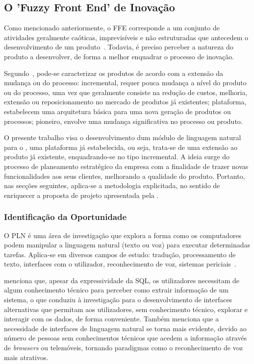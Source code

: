 \subsection{O 'Fuzzy Front End' de Inovação}

Como mencionado anteriormente, o \gls{FFE} corresponde a um conjunto de atividades geralmente caóticas, imprevisíveis e não estruturadas que antecedem o desenvolvimento de um produto~\parencite{ffe_incremental_platform_breakthrough_products}. Todavia, é preciso perceber a natureza do produto a desenvolver, de forma a melhor enquadrar o processo de inovação.

Segundo~\textcite{ffe_incremental_platform_breakthrough_products}, pode-se caracterizar os produtos de acordo com a extensão da mudança ou do processo: incremental, requer pouca mudança a nível do produto ou do processo, uma vez que geralmente consiste na redução de custos, melhoria, extensão ou reposicionamento no mercado de produtos já existentes; plataforma, estabelecem uma arquitetura básica para uma nova geração de produtos ou processos; pioneiro, envolve uma mudança significativa no processo ou produto.

O presente trabalho visa o desenvolvimento dum módulo de linguagem natural para o {\productname}, uma plataforma já estabelecida, ou seja, trata-se de uma extensão ao produto já existente, enquadrando-se no tipo incremental. A ideia surge do processo de planeamento estratégico da empresa com a finalidade de trazer novas funcionalidades aos seus clientes, melhorando a qualidade do produto. Portanto, nas secções seguintes, aplica-se a metodologia explicitada, no sentido de enriquecer a proposta de projeto apresentada pela {\companyname}.

\subsubsection*{Identificação da Oportunidade}

O \gls{PLN} é uma área de investigação que explora a forma como os computadores podem manipular a linguagem natural (texto ou voz) para executar determinadas tarefas. Aplica-se em diversos campos de estudo: tradução, processamento de texto, interfaces com o utilizador, reconhecimento de voz, sistemas periciais~\parencite{nlp}.

\textcite{end_to_end_neural_nli_databases} menciona que, apesar da expressividade da \gls{SQL}, os utilizadores necessitam de algum conhecimento técnico para perceber como extrair informação de um sistema, o que conduziu à investigação para o desenvolvimento de interfaces alternativas que permitam aos utilizadores, sem conhecimento técnico, explorar e interagir com os dados, de forma conveniente. Também \textcite{towards_theory_nli_databases} menciona que a necessidade de interfaces de linguagem natural se torna mais evidente, devido ao número de pessoas sem conhecimentos técnicos que acedem a informação através de \textit{browsers} ou telemóveis, tornando paradigmas como o reconhecimento de voz mais atrativos.

